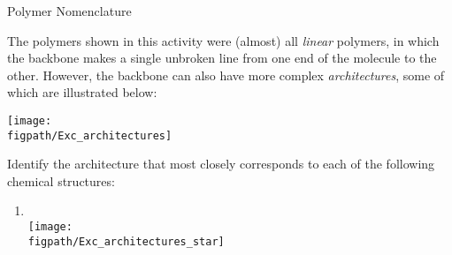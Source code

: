 \begin{activity}{Polymer Nomenclature}
\begin{ctqs}
\begin{enumerate}
				\begin{solution}[1in]
				\end{solution}
				
		\end{enumerate}
	
\end{ctqs}



\begin{exercises}

	
		
		
			
			
			
		
		
	
		
	\exercise The polymers shown in this activity were (almost) all \emph{linear} polymers, in which the backbone makes a single unbroken line from one end of the molecule to the other.  However, the backbone can also have more complex \emph{architectures}, some of which are illustrated below:
	
	\vspace{6pt}	\centerline{\texttt{[image: \\figpath/Exc\_architectures]}}
	
		Identify the architecture that most closely corresponds to each of the following chemical structures:
		
		\begin{enumerate}
			\item \text{}\\ \texttt{[image: \\figpath/Exc\_architectures\_star]}
			

\end{enumerate}
\end{exercises}
\end{activity}
